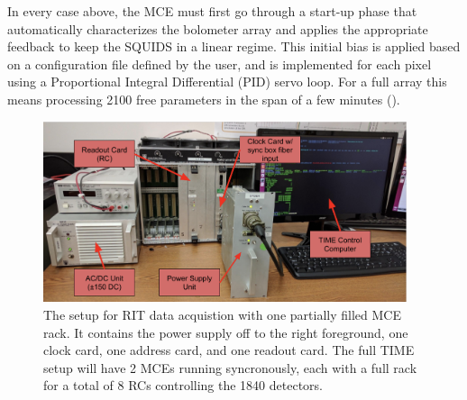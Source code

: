 \documentclass[manuscript]{aastex}
\begin{document}
In every case above, the MCE must first go through a start-up phase that automatically characterizes the bolometer array and applies the appropriate feedback to keep the SQUIDS in a linear regime. This initial bias is applied based on a configuration file defined by the user, and is implemented for each pixel using a Proportional Integral Differential (PID) servo loop. For a full array this means processing 2100 free parameters in the span of a few minutes (\cite{Dobbs2009}).

\begin{figure}[H]
\centering
\captionsetup{width=0.95\textwidth}
\includegraphics[width=0.95\textwidth]{timemce.png}
\caption[MCE RIT Setup with Incomplete Rack]{The setup for RIT data acquistion with one partially filled MCE rack. It contains the power supply off to the right foreground, one clock card, one address card, and one readout card. The full TIME setup will have 2 MCEs running syncronously, each with a full rack for a total of 8 RCs controlling the 1840 detectors.}
\label{fig:mce}
\vspace{-0.8cm}
\end{figure}

\end{document}
